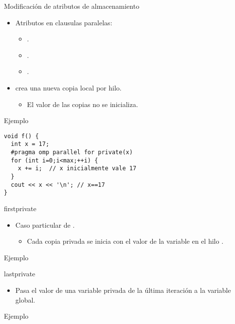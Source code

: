 \begin{frame}[t,fragile]{Modificación de atributos de almacenamiento}
\begin{itemize}
  \item Atributos en clausulas paralelas:
    \begin{itemize}
      \item {}.
      \item {}.
      \item {}.
    \end{itemize}

  \item {} crea una nueva copia local por hilo.
    \begin{itemize}
      \item El valor de las copias no se inicializa.
    \end{itemize}
\end{itemize}

\begin{block}{Ejemplo}
\begin{lstlisting}[basicstyle=\tiny]
void f() {
  int x = 17;
  #pragma omp parallel for private(x) 
  for (int i=0;i<max;++i) {
    x += i;  // x inicialmente vale 17
  }
  cout << x << '\n'; // x==17
}
\end{lstlisting}
\end{block}
\end{frame}

\begin{frame}[t,fragile]{firstprivate}
\begin{itemize}
  \item Caso particular de .
    \begin{itemize}
      \item Cada copia privada se inicia con el valor de la variable en el
            hilo .
    \end{itemize}
\end{itemize}

\begin{block}{Ejemplo}

\end{block}
\end{frame}

\begin{frame}[t,fragile]{lastprivate}
\begin{itemize}
  \item Pasa el valor de una variable privada de la última iteración  a la
        variable global.
\end{itemize}

\begin{block}{Ejemplo}

\end{block}
\end{frame}
